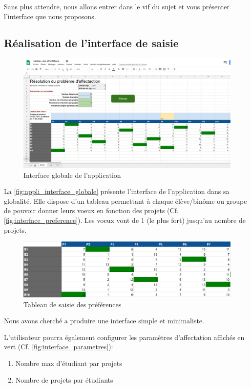 \documentclass[final,poster]{polytech/polytech}
\begin{document}
Sans plus attendre, nous allons entrer dans le vif du sujet et vous présenter l'interface que nous proposons.

\subsection{Réalisation de l'interface de saisie}

\begin{figure}
\includegraphics[width=15cm]{images/interface_appli_globale}
\caption{\label{fig:appli_interface_globale} Interface globale de l'application}
\end{figure}

La \autoref{fig:appli_interface_globale} présente l'interface de l'application dans sa globalité.
Elle dispose d'un tableau permettant à chaque élève/binôme ou groupe de pouvoir donner leurs voeux en fonction des projets (Cf. \autoref{fig:interface_preference}). Les voeux vont de 1 (le plus fort) jusqu’au nombre de projets.

\begin{figure}
\includegraphics[width=15cm]{images/interface_preferences}
\caption{\label{fig:interface_preference}Tableau de saisie des préférences}
\end{figure}

Nous avons cherché a produire une interface simple et minimaliste.

L'utilisateur pourra également configurer les paramètres d'affectation affichés en vert (Cf. \autoref{fig:interface_parametres}):
\begin{enumerate}
\item Nombre max d’étudiant par projets
\item Nombre de projets par étudiants
\end{enumerate}
\end{document}

